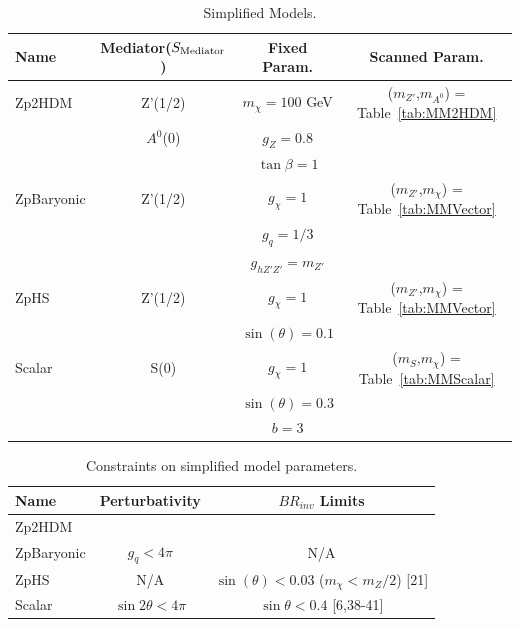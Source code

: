 \begin{table}[htbH]
\begin{tabular}{ l | c | c | c}
\hline
Name & Mediator($S_{\rm{Mediator}}$) & Fixed Param. & Scanned Param.\\
\hline
Zp2HDM & Z'(1/2) & $m_\chi = 100$ GeV & ($m_{Z'}$,$m_{A^0}$) = Table~\ref{tab:MM2HDM} \\
 & $A^0$(0) & $g_Z = 0.8$ &  \\
 & & $\tan\beta = 1$ &  \\
\hline
ZpBaryonic & Z'(1/2) & $g_\chi = 1$ & ($m_{Z'}$,$m_\chi$) = Table~\ref{tab:MMVector} \\
 & & $g_q = 1/3$ &  \\
 & & $g_{hZ'Z'} = m_{Z'}$ &  \\
\hline
ZpHS & Z'(1/2) & $g_\chi = 1$ & ($m_{Z'}$,$m_\chi$) = Table~\ref{tab:MMVector} \\
 & & $\sin(\theta) = 0.1$ & \\
\hline
Scalar & S(0) & $g_\chi = 1$ & ($m_{S}$,$m_\chi$) = Table~\ref{tab:MMScalar}\\
 & & $\sin(\theta) = 0.3$ & \\
 & & $b = 3$ & \\
\hline
\end{tabular}
\caption{Simplified Models.}\label{tab:sms}
\end{table}

\begin{table}[htbH]
\begin{center}
\begin{tabular}{ l | c | c}
\hline
Name & Perturbativity & $BR_{inv}$ Limits \\
\hline
Zp2HDM & & \\
ZpBaryonic & $g_q<4\pi$ & N/A\\
ZpHS & N/A & $\sin(\theta) < 0.03$ ($m_\chi < m_Z/2$) [21] \\
Scalar & $\sin2\theta<4\pi$ & $\sin\theta<0.4$ [6,38-41]\\
\hline
\end{tabular}
\caption{Constraints on simplified model parameters.}\label{tab:smlims}
\end{center}
\end{table}

